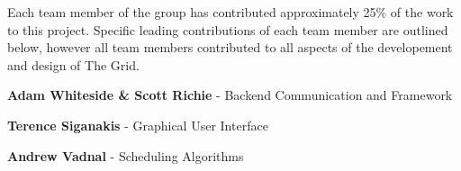Each team member of the group has contributed approximately 25\% of the work to this project. Specific leading contributions of each team member are outlined below, however all team members contributed to all aspects of the developement and design of The Grid. 

\textbf{Adam Whiteside \& Scott Richie} - Backend Communication and Framework

\textbf{Terence Siganakis} - Graphical User Interface

\textbf{Andrew Vadnal} - Scheduling Algorithms




